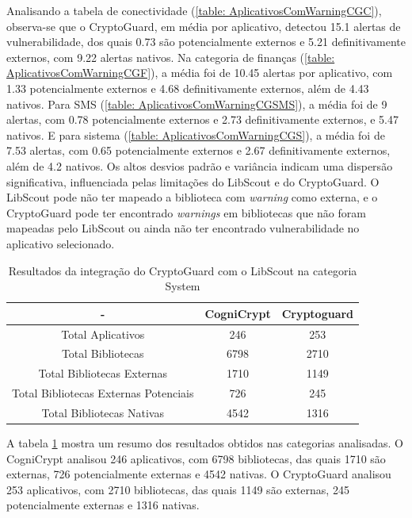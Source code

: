 Analisando a tabela de conectividade (\ref{table: AplicativosComWarningCGC}), observa-se que o CryptoGuard, em média por aplicativo, detectou \num{15.1} alertas de vulnerabilidade, dos quais \num{0.73} são potencialmente externos e \num{5.21} definitivamente externos, com \num{9.22} alertas nativos. 
Na categoria de finanças (\ref{table: AplicativosComWarningCGF}), a média foi de \num{10.45} alertas por aplicativo, com \num{1.33} potencialmente externos e \num{4.68} definitivamente externos, além de \num{4.43} nativos.
Para SMS (\ref{table: AplicativosComWarningCGSMS}), a média foi de \num{9} alertas, com \num{0.78} potencialmente externos e \num{2.73} definitivamente externos, e \num{5.47} nativos.
E para sistema (\ref{table: AplicativosComWarningCGS}), a média foi de \num{7.53} alertas, com \num{0.65} potencialmente externos e \num{2.67} definitivamente externos, além de \num{4.2} nativos. 
Os altos desvios padrão e variância indicam uma dispersão significativa, influenciada pelas limitações do LibScout e do CryptoGuard. O LibScout pode não ter mapeado a biblioteca com \textit{warning} como externa, e o CryptoGuard pode ter encontrado \textit{warnings} em bibliotecas que não foram mapeadas pelo LibScout ou ainda não ter encontrado vulnerabilidade no aplicativo selecionado.


\begin{table}[!htbp]
  \centering
  \small
  \begin{tabular}{|c|c|c|}
    \hline
    \textbf{-} & \textbf{CogniCrypt} & \textbf{Cryptoguard} \\
    \hline
    Total Aplicativos & \num{246} & \num{253} \\
    Total Bibliotecas & \num{6798} & \num{2710}  \\
    Total Bibliotecas Externas & \num{1710} & \num{1149} \\
    Total Bibliotecas Externas Potenciais & \num{726} & \num{245} \\
    Total Bibliotecas Nativas & \num{4542} & \num{1316} \\
    \hline
  \end{tabular}
  \caption{Resultados da integração do CryptoGuard com o LibScout na categoria System}
  \label{table: AplicativosComWarningSummary}
\end{table}

A tabela \ref{table: AplicativosComWarningSummary} mostra um resumo dos resultados obtidos nas categorias analisadas. O CogniCrypt analisou 246 aplicativos, com 6798 bibliotecas, das quais 1710 são externas, 726 potencialmente externas e 4542 nativas. O CryptoGuard analisou 253 aplicativos, com 2710 bibliotecas, das quais 1149 são externas, 245 potencialmente externas e 1316 nativas.


